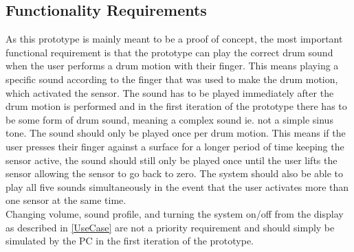 \subsection{Functionality Requirements}
\label{Krav_til_funktionalitet}
As this prototype is mainly meant to be a proof of concept, the most important functional requirement is that the prototype can play the correct drum sound when the user performs a drum motion with their finger. This means playing a specific sound according to the finger that was used to make the drum motion, which activated the sensor. The sound has to be played immediately after the drum motion is performed and in the first iteration of the prototype there has to be some form of drum sound, meaning a complex sound ie. not a simple sinus tone. The sound should only be played once per drum motion. This means if the user presses their finger against a surface for a longer period of time keeping the sensor active, the sound should still only be played once until the user lifts the sensor allowing the sensor to go back to zero. The system should also be able to play all five sounds simultaneously in the event that the user activates more than one sensor at the same time.\\
Changing volume, sound profile, and turning the system on/off from the display as described in \autoref{UseCase} are not a priority requirement and should simply be simulated by the PC in the first iteration of the prototype.



